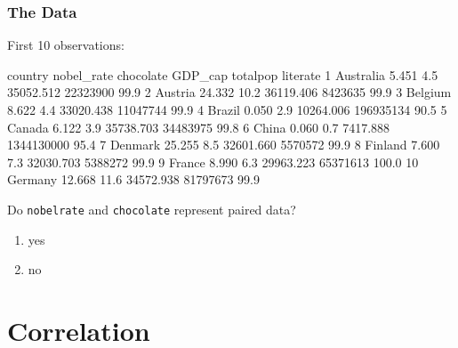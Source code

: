 \begin{frame}[fragile]
\frametitle{The Data}
First 10 observations:
\vskip10pt
\begin{lcverbatim}
     country nobel_rate chocolate   GDP_cap   totalpop literate
1  Australia      5.451       4.5 35052.512   22323900     99.9
2    Austria     24.332      10.2 36119.406    8423635     99.9
3    Belgium      8.622       4.4 33020.438   11047744     99.9
4     Brazil      0.050       2.9 10264.006  196935134     90.5
5     Canada      6.122       3.9 35738.703   34483975     99.8
6      China      0.060       0.7  7417.888 1344130000     95.4
7    Denmark     25.255       8.5 32601.660    5570572     99.9
8    Finland      7.600       7.3 32030.703    5388272     99.9
9     France      8.990       6.3 29963.223   65371613    100.0
10   Germany     12.668      11.6 34572.938   81797673     99.9
\end{lcverbatim}
\vskip5pt
\begin{clicker}{Do \texttt{nobel\textunderscore rate} and \texttt{chocolate} represent paired data?}
\begin{enumerate}
    \item
    yes
    \item
    no
\end{enumerate}
\end{clicker}
\end{frame}

\section[Correlation]{Correlation}
\begin{frame}
\end{frame}

